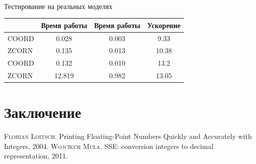 \documentclass[specialist,subf,href,colorlinks=true,14pt
,times,mtpro,specialist
]{disser}
\begin{document}
\begin{figure}[h!]
\\
\end{figure}


Тестирование на реальных моделях
\begin{tabular}{||l||c|c|c||}
\hline
\hline
& Время работы & Время работы & Ускорение \\
\hline
\hline
COORD & 0.028 & 0.003 & 9.33 \\
\hhline{~|-|-|-|}
ZCORN & 0.135 & 0.013 & 10.38 \\
\hline
COORD & 0.132 &  0.010 & 13.2 \\
\hhline{~|-|-|-|}
ZCORN & 12.819 & 0.982 & 13.05 \\
\hline
\hline
\end{tabular}


\section{Заключение}
\newpage

\newpage
\begin{thebibliography}{}

 \textsc{Florian Loitsch}.
Printing Floating-Point Numbers Quickly and Accurately with Integers, 2004.
 \textsc{Wojciech Mu\l a}.
SSE: conversion integers to decimal representation, 2011.


\end{thebibliography}
\end{document}
